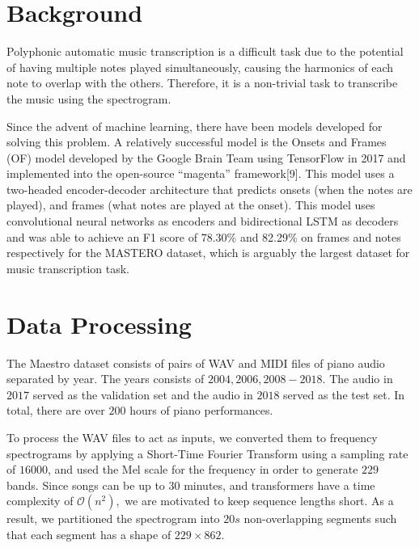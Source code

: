 \documentclass[a4paper,twocolumn,10pt]{article}
\begin{document}
\section{Background}
Polyphonic automatic music transcription is a difficult task due to the potential of having multiple notes played simultaneously, causing the harmonics of each note to overlap with the others. Therefore, it is a non-trivial task to transcribe the music using the spectrogram. 

Since the advent of machine learning, there have been models developed for solving this problem. A relatively successful model is the Onsets and Frames (OF) model developed by the Google Brain Team using TensorFlow in 2017 and implemented into the open-source “magenta” framework[9]. This model uses a two-headed encoder-decoder architecture that predicts onsets (when the notes are played), and frames (what notes are played at the onset). This model uses convolutional neural networks as encoders and bidirectional LSTM as decoders and was able to achieve an F1 score of 78.30\% and 82.29\% on frames and notes respectively for the MASTERO dataset, which is arguably the largest dataset for music transcription task.

\section{Data Processing}
The Maestro dataset consists of pairs of WAV and MIDI files of piano audio separated by year. The years consists of $2004,2006,2008-2018.$ The audio in $2017$ served as the validation set and the audio in $2018$ served as the test set. In total, there are over $200$ hours of piano performances.

To process the WAV files to act as inputs, we converted them to frequency spectrograms by applying a Short-Time Fourier Transform using a sampling rate of $16000$, and used the Mel scale for the frequency in order to generate $229$ bands. Since songs can be up to $30$ minutes, and transformers have a time complexity of $\mathcal{O}(n^2),$ we are motivated to keep sequence lengths short. As a result, we partitioned the spectrogram into $20s$ non-overlapping segments such that each segment has a shape of $229 \times 862.$
\end{document}
